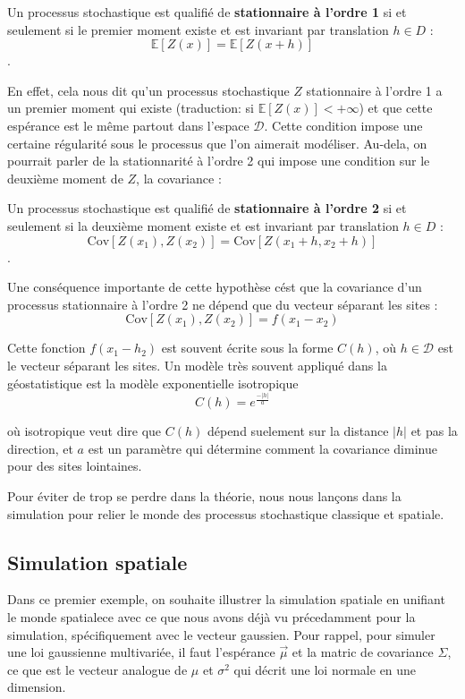 \documentclass[10pt]{article} %
\begin{document}
\begin{definition}
    Un processus stochastique est qualifié de \textbf{stationnaire à l'ordre 1} si et seulement si le premier moment existe et est invariant par translation $h \in D$ :
    $$ \mathbb{E}[Z(x)] = \mathbb{E}[Z(x + h)]$$.
\end{definition}

En effet, cela nous dit qu'un processus stochastique $Z$ stationnaire à l'ordre 1 a un premier moment qui existe (traduction: si $\mathbb{E}[Z(x)] < +\infty$) et que cette espérance
est le même partout dans l'espace $\mathcal{D}$. Cette condition impose une certaine régularité sous le processus que l'on aimerait modéliser. Au-dela, on pourrait parler de la stationnarité
à l'ordre 2 qui impose une condition sur le deuxième moment de $Z$, la covariance :

\begin{definition}
    Un processus stochastique est qualifié de \textbf{stationnaire à l'ordre 2} si et seulement si la deuxième moment existe et est invariant par translation $h \in D$ :
    $$ \mathrm{Cov}[Z(x_1), Z(x_2)] = \mathrm{Cov}[Z(x_1 + h, x_2 + h)]$$.
\end{definition}

Une conséquence importante de cette hypothèse cést que la covariance d'un processus stationnaire à l'ordre 2 ne dépend que du vecteur séparant les sites :
    $$ \mathrm{Cov}[Z(x_1), Z(x_2)] = f(x_1 - x_2) $$

Cette fonction $f(x_1 - h_2)$ est souvent écrite sous la forme $C(h)$, où $h \in \mathcal{D}$ est le vecteur séparant les sites. Un modèle très souvent appliqué dans la géostatistique est la modèle exponentielle isotropique
$$ C(h) = e^{\frac{-|h|}{a}} $$

où isotropique veut dire que $C(h)$ dépend suelement sur la distance $|h|$ et pas la direction, et $a$ est un paramètre qui détermine comment la covariance diminue pour des sites lointaines.

Pour éviter de trop se perdre dans la théorie, nous nous lan\c cons dans la simulation pour relier le monde des processus stochastique classique et spatiale.

\subsection{Simulation spatiale}

Dans ce premier exemple, on souhaite illustrer la simulation spatiale en unifiant le monde spatialece avec ce que nous avons déjà vu précedamment pour la simulation,
spécifiquement avec le vecteur gaussien. Pour rappel, pour simuler une loi gaussienne multivariée, il faut l'espérance $\vec\mu$ et la matric de covariance $\Sigma$,
ce que est le vecteur analogue de $\mu$ et $\sigma^2$ qui décrit une loi normale en une dimension.
\end{document}
